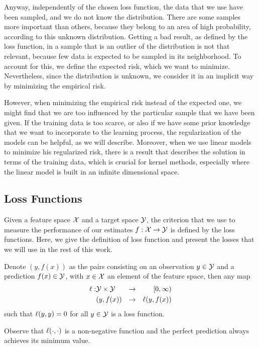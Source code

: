 Anyway, independently of the chosen loss function, the data that we use have been sampled, and we do not know the distribution. There are some samples more important than others, because they belong to an area of high probability, according to this unknown distribution. Getting a bad result, as defined by the loss function, in a sample that is an outlier of the distribution is not that relevant, because few data is expected to be sampled in its neighborhood. 
To account for this, we define the expected risk, which we want to minimize. Nevertheless, since the distribution is unknown, we consider it in an implicit way by minimizing the empirical risk.

%
However, when minimizing the empirical risk instead of the expected one, we might find that we are too influenced by the particular sample that we have been given.  If the training data is too scarce, or also if we have some prior knowledge that we want to incorporate to the learning process, the regularization of the models can be helpful, as we will describe.
%
Moreover, when we use linear models to minimize his regularized risk, there is a result that describes the solution in terms of the training data, which is crucial for kernel methods, especially where the linear model is built in an infinite dimensional space.

\subsection{Loss Functions}
Given a feature space $\mathcal{X}$ and a target space $\mathcal{Y}$, the criterion that we use to measure the performance of our estimates $f: \mathcal{X} \to \mathcal{Y}$ is defined by the loss functions.
Here, we give the definition of loss function and present the losses that we will use in the rest of this work.

\begin{definition}
    Denote $(y, f(x))$ as the pairs consisting on an observation $y \in \mathcal{Y}$ and a prediction $f(x) \in \mathcal{Y}$, with $x \in \mathcal{X}$ an element of the feature space, then any map
    \begin{equation}
        \begin{aligned}
    \nonumber
    \ell: &\mathcal{Y} \times \mathcal{Y} &\to &&[0, \infty) \\
    &(y, f(x)) &\to  && \ell(y, f(x)) 
\end{aligned}
\end{equation}
    such that $\ell(y, y) = 0$ for all $y \in \mathcal{Y}$ is a loss function.
\end{definition}
Observe that $\ell(\cdot, \cdot)$ is a non-negative function and the perfect prediction always achieves its minimum value.

